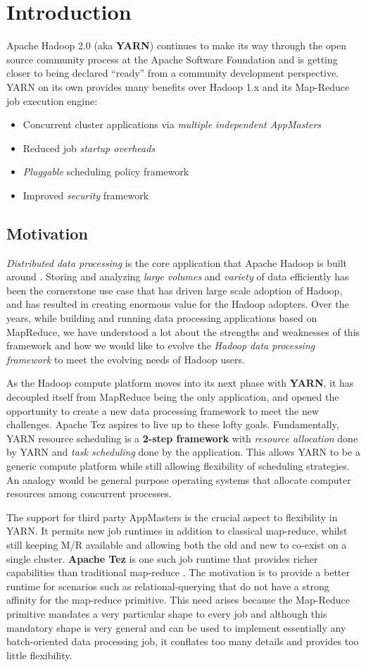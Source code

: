 \documentclass[twocolumn]{article}
\newcommand{\bi}{\begin{itemize}}
\newcommand{\ei}{\end{itemize}}
\newcommand{\ii}{\item}
\begin{document}
\section{Introduction}
Apache Hadoop 2.0 (aka \textbf{YARN}) continues to make its way through the open source community process at the Apache Software Foundation and is getting closer to being declared “ready” from a community development perspective.  YARN on its own provides many benefits over Hadoop 1.x and its Map-Reduce job execution engine:

\bi
\ii Concurrent cluster applications via \textit{multiple independent AppMasters}
\ii Reduced job \textit{startup overheads}
\ii \textit{Pluggable} scheduling policy framework
\ii Improved \textit{security} framework
\ei

\subsection{Motivation}

\emph{Distributed data processing} is the core application that Apache
Hadoop is built around \cite{FOWLER:2013}.  Storing and analyzing \emph{large volumes} and
\emph{variety} of data efficiently has been the cornerstone use case
that has driven large scale adoption of Hadoop, and has resulted in
creating enormous value for the Hadoop adopters. Over the years, while
building and running data processing applications based on MapReduce, we
have understood a lot about the strengths and weaknesses of this
framework and how we would like to evolve the \emph{Hadoop data
processing framework} to meet the evolving needs of Hadoop users. 

As the Hadoop compute platform moves into its next phase with \textbf{YARN}, it
has decoupled itself from MapReduce being the only application, and
opened the opportunity to create a new data processing framework to meet
the new challenges. Apache Tez aspires to live up to these lofty goals.
Fundamentally, YARN resource scheduling is a \textbf{2-step framework} with \textit{resource allocation} done by YARN and \textit{task scheduling} done by the application. This allows YARN to be a generic compute platform while still allowing flexibility of scheduling strategies. An analogy would be general purpose operating systems that allocate computer resources among concurrent processes.

The support for third party AppMasters is the crucial aspect to flexibility in YARN.  It permits new job runtimes in addition to classical map-reduce, whilst still keeping M/R available and allowing both the old and new to co-exist on a single cluster.  \textbf{Apache Tez} is one such job runtime that provides richer capabilities than traditional map-reduce \cite{hortonworks}.  The motivation is to provide a better runtime for scenarios such as relational-querying that do not have a strong affinity for the map-reduce primitive.   This need arises because the Map-Reduce primitive mandates a very particular shape to every job and although this mandatory shape is very general and can be used to implement essentially any batch-oriented data processing job, it conflates too many details and provides too little flexibility.
\end{document}
